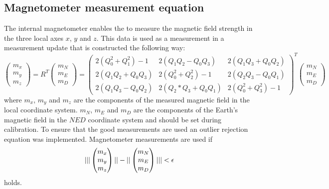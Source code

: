 \subsection{Magnetometer measurement equation}
The internal magnetometer enables the \abbrROV to measure the magnetic field strength in the three local axes $x$, $y$ and $z$. This data is used as a measurement in a measurement update that is constructed the following way:
\begin{equation}
    \begin{pmatrix}
        m_x\\
        m_y\\
        m_z
    \end{pmatrix} = 
    R^T
    \begin{pmatrix}
        m_N\\
        m_E\\
        m_D
    \end{pmatrix}=
    \begin{pmatrix}
        2(Q_0^2+Q_1^2) - 1 &  2(Q_1 Q_2-Q_0 Q_3) &    2 (Q_1 Q_3+Q_0 Q_2)\\
        2(Q_1 Q_2+Q_0 Q_3) &  2(Q_0^2+Q_2^2) - 1 &  2(Q_2 Q_3-Q_0 Q_1)\\
        2(Q_1 Q_3-Q_0 Q_2) &  2(Q_2*Q_3+Q_0 Q_1) &    2(Q_0^2+Q_3^2) - 1
    \end{pmatrix}^T
    \begin{pmatrix}
        m_N\\
        m_E\\
        m_D
    \end{pmatrix}
\end{equation}
where $m_x$, $m_y$ and $m_z$ are the components of the measured magnetic field in the local coordinate system. $m_N$, $m_E$ and $m_D$ are the components of the Earth's magnetic field in the $NED$ coordinate system and should be set during calibration.
To ensure that the good measurements are used an outlier rejection equation was implemented. Magnetometer measurements are used if 
\begin{equation}
        | ||
    \begin{pmatrix}
        m_x\\
        m_y\\
        m_z
    \end{pmatrix}||
    -
    ||
    \begin{pmatrix}
        m_N\\
        m_E\\
        m_D
    \end{pmatrix}||
     | < \epsilon
\end{equation}
holds.

